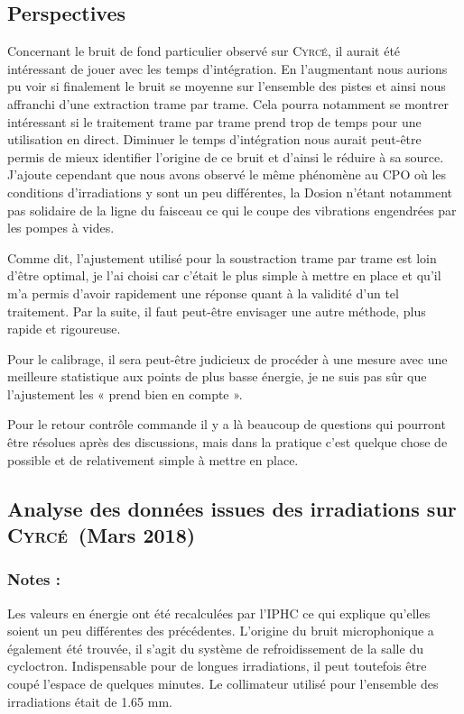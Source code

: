 \documentclass[a4paper,11pt]{article}
\newcommand{\cyrce}{\textsc{Cyrcé}}
\begin{document}
\subsection*{Perspectives}
Concernant le bruit de fond particulier observé sur \cyrce , il aurait été intéressant de jouer avec les temps d'intégration. 
En l'augmentant nous aurions pu voir si finalement le bruit se moyenne sur l'ensemble des pistes et ainsi nous affranchi d'une extraction trame par trame. 
Cela pourra notamment se montrer intéressant si le traitement trame par trame prend trop de temps pour une utilisation en direct. 
Diminuer le temps d'intégration nous aurait peut-être permis de mieux identifier l'origine de ce bruit et d'ainsi le réduire à sa source.
J'ajoute cependant que nous avons observé le même phénomène au CPO où les conditions d'irradiations y sont un peu différentes, la Dosion n'étant notamment pas solidaire de la ligne du faisceau ce qui le coupe des vibrations engendrées par les pompes à vides.

Comme dit, l'ajustement utilisé pour la soustraction trame par trame est loin d'être optimal, je l'ai choisi car c'était le plus simple à mettre en place et qu'il m'a permis d'avoir rapidement une réponse quant à la validité d'un tel traitement. 
Par la suite, il faut peut-être envisager une autre méthode, plus rapide et rigoureuse.

Pour le calibrage, il sera peut-être judicieux de procéder à une mesure avec une meilleure statistique aux points de plus basse énergie, je ne suis pas sûr que l'ajustement les « prend bien en compte ».

Pour le retour contrôle commande il y a là beaucoup de questions qui pourront être résolues après des discussions, mais dans la pratique c'est quelque chose de possible et de relativement simple à mettre en place.

\newpage

\begin{center}
\subsection*{Analyse des données issues des irradiations sur \cyrce\ (Mars 2018)}
\end{center}

\subsubsection*{Notes :}
Les valeurs en énergie ont été recalculées par l'IPHC ce qui explique qu'elles soient un peu différentes des précédentes.
L'origine du bruit microphonique a également été trouvée, il s'agit du système de refroidissement de la salle du cycloctron.
Indispensable pour de longues irradiations, il peut toutefois être coupé l'espace de quelques minutes.
Le collimateur utilisé pour l'ensemble des irradiations était de 1.65 mm.
\end{document}
